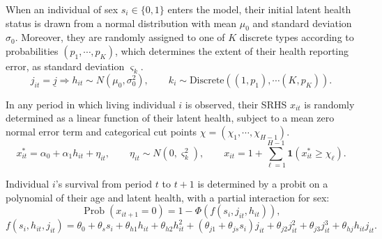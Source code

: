 \documentclass[12pt,pdftex,letterpaper]{article}
\newcommand{\Prob}{\operatorname{Prob}}
\newcommand{\Health}{h}
\newcommand{\TopHealth}{H}
\newcommand{\Report}{x}
\newcommand{\Age}{j}
\newcommand{\Sex}{s}
\newcommand{\AgeMin}{\underline{\Age}}
\newcommand{\HealthInitMean}{\mu_0}
\newcommand{\HealthInitStd}{\sigma_0}
\newcommand{\Cut}{\chi}
\newcommand{\MortParam}{\theta}
\newcommand{\LatentParam}{\alpha}
\newcommand{\ReportShock}{\eta}
\newcommand{\TypeProb}{p}
\newcommand{\ReportStd}{\varsigma}
\begin{document}
When an individual of sex $\Sex_i \in \{0,1\}$ enters the model, their initial latent health status is drawn from a normal distribution with mean $\HealthInitMean$ and standard deviation $\HealthInitStd$. Moreover, they are randomly assigned to one of $K$ discrete types according to probabilities $(\TypeProb_1,\cdots,\TypeProb_K)$, which determines the extent of their health reporting error, as standard deviation $\ReportStd_k$.
\begin{equation}\label{HealthInit}
\Age_{it}=\AgeMin \Longrightarrow \Health_{it} \sim N(\HealthInitMean, \HealthInitStd^2), \qquad k_i \sim \text{Discrete}\left((1,\TypeProb_1),\cdots (K,\TypeProb_K) \right).
\end{equation}

In any period in which living individual $i$ is observed, their SRHS $\Report_{it}$ is randomly determined as a linear function of their latent health, subject to a mean zero normal error term and categorical cut points $\Cut = (\Cut_1, \cdots, \Cut_{\TopHealth-1})$.
\begin{equation}\label{Report}
\Report^*_{it} = \LatentParam_0 + \LatentParam_1 \Health_{it} + \ReportShock_{it}, \qquad \ReportShock_{it} \sim N(0,\ReportStd_k^2), \qquad \Report_{it} = 1 + \sum_{\ell = 1}^{\TopHealth-1} \mathbf{1}(\Report^*_{it} \geq \Cut_\ell). 
\end{equation}

Individual $i$'s survival from period $t$ to $t+1$ is determined by a probit on a polynomial of their age and latent health, with a partial interaction for sex:
\begin{equation}\label{Mortality}
\Prob(\Report_{it+1} = 0) = 1 - \Phi(f(\Sex_i,\Age_{it}, \Health_{it})),
\end{equation}
\begin{equation*}
f(\Sex_i,\Health_{it}, \Age_{it}) = \MortParam_0 + \MortParam_\Sex \Sex_i + \MortParam_{\Health1} \Health_{it} + \MortParam_{\Health2} \Health_{it}^2 + (\MortParam_{\Age1} + \MortParam_{\Age\Sex}\Sex_i) \Age_{it} + \MortParam_{\Age2} \Age_{it}^2 + \MortParam_{\Age3} \Age_{it}^3 + \MortParam_{\Health \Age} \Health_{it} \Age_{it}.
\end{equation*}
\end{document}
